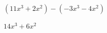
\question $(11x^3 + 2x^2) - (-3x^3 - 4x^2)$

  \begin{solutionorlines}[2cm]
    $14x^3 + 6x^2$
  \end{solutionorlines}
